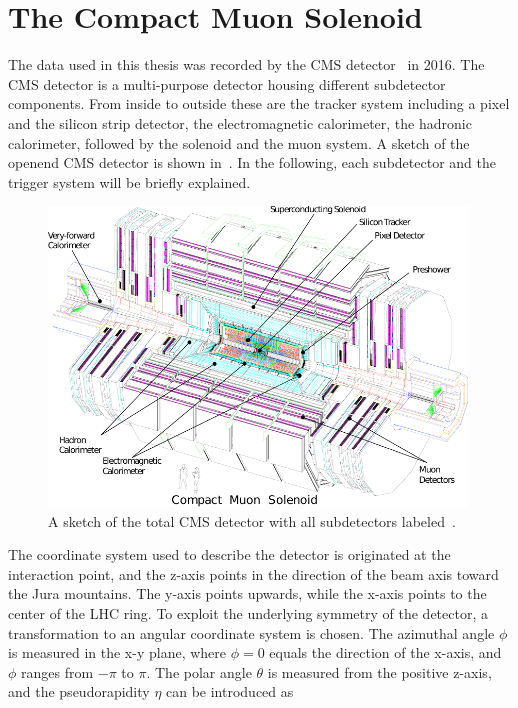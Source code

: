\section{The Compact Muon Solenoid}\label{sec:CMS}
The data used in this thesis was recorded by the CMS detector~\cite{CMS,CMSTDR} in 2016. The CMS detector is a multi-purpose detector housing different subdetector components. From inside to outside these are the tracker system including a pixel and the silicon strip detector, the electromagnetic calorimeter, the hadronic calorimeter, followed by the solenoid and the muon system. A sketch of the openend CMS detector is shown in~. In the following, each subdetector and the trigger system will be briefly explained.\\
\begin{figure}[tbp]
 \centering
 \includegraphics[width=0.99\textwidth]{figures/general/cms}
 \caption{A sketch of the total CMS detector with all subdetectors labeled~\cite{CMSTDR}.}
 \label{fig:CMS}
\end{figure}
The coordinate system used to describe the detector is originated at the interaction point, and the z-axis points in the direction of the beam axis toward the Jura mountains. The y-axis points upwards, while the x-axis points to the center of the LHC ring. To exploit the underlying symmetry of the detector, a transformation to an angular coordinate system is chosen. The azimuthal angle $\phi$ is measured in the x-y plane, where $\phi=0$ equals the direction of the x-axis, and $\phi$ ranges from $-\pi$ to $\pi$. The polar angle $\theta$ is measured from the positive z-axis, and the pseudorapidity $\eta$ can be introduced as
